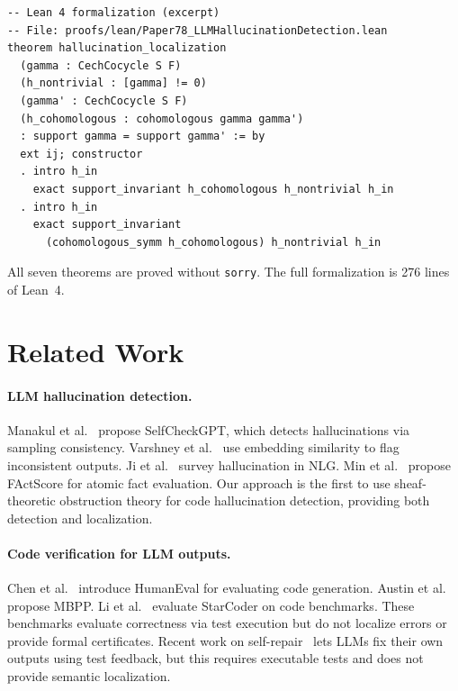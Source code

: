 \documentclass[11pt]{article}
\begin{document}
\begin{lstlisting}[language={},style=jugeo-output]
-- Lean 4 formalization (excerpt)
-- File: proofs/lean/Paper78_LLMHallucinationDetection.lean
theorem hallucination_localization
  (gamma : CechCocycle S F)
  (h_nontrivial : [gamma] != 0)
  (gamma' : CechCocycle S F)
  (h_cohomologous : cohomologous gamma gamma')
  : support gamma = support gamma' := by
  ext ij; constructor
  . intro h_in
    exact support_invariant h_cohomologous h_nontrivial h_in
  . intro h_in
    exact support_invariant
      (cohomologous_symm h_cohomologous) h_nontrivial h_in
\end{lstlisting}

All seven theorems are proved without \texttt{sorry}.  The full
formalization is 276 lines of Lean~4.


\section{Related Work}\label{sec:related}

\paragraph{LLM hallucination detection.}
Manakul et al.~\cite{Manakul2023} propose SelfCheckGPT, which
detects hallucinations via sampling consistency.  Varshney et
al.~\cite{Varshney2023} use embedding similarity to flag
inconsistent outputs.  Ji et al.~\cite{Ji2023survey} survey
hallucination in NLG.  Min et al.~\cite{Min2023factscore} propose
FActScore for atomic fact evaluation.  Our approach is the first to
use sheaf-theoretic obstruction theory for code hallucination
detection, providing both detection and localization.

\paragraph{Code verification for LLM outputs.}
Chen et al.~\cite{Chen2021} introduce HumanEval for evaluating code
generation.  Austin et al.~\cite{Austin2021} propose MBPP.
Li et al.~\cite{Li2023starcoder} evaluate StarCoder on code
benchmarks.  These benchmarks evaluate correctness via test execution
but do not localize errors or provide formal certificates.  Recent
work on self-repair~\cite{Olausson2023selfrepair} lets LLMs fix their
own outputs using test feedback, but this requires executable tests
and does not provide semantic localization.
\end{document}
